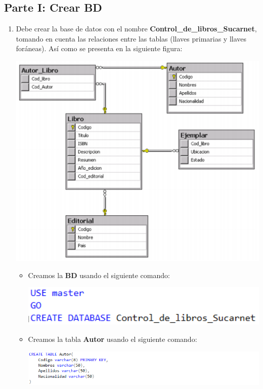 \documentclass{article}
\begin{document}
    \subsection{Parte I: Crear BD}
    \begin{enumerate}[\tab 1.]
        \item Debe crear la base de datos con el nombre \textbf{Control\_de\_libros\_Sucarnet}, tomando en cuenta las relaciones entre las tablas (llaves primarias y llaves foráneas). Así como se presenta en la siguiente figura:\\[0.1in]
        \begin{center}
            \includegraphics[width=13cm]{./images/1.png}
        \end{center}
        \begin{itemize}
            \item Creamos la \textbf{BD} usando el siguiente comando:
            \begin{center}
                \includegraphics[width=13cm]{./images/1.1.png}
            \end{center}
            \newpage
            \item Creamos la tabla \textbf{Autor} usando el siguiente comando:
            \begin{center}
                \includegraphics[width=13cm]{./images/1.2.png}

\end{center}
\end{itemize}
\end{enumerate}
\end{document}
